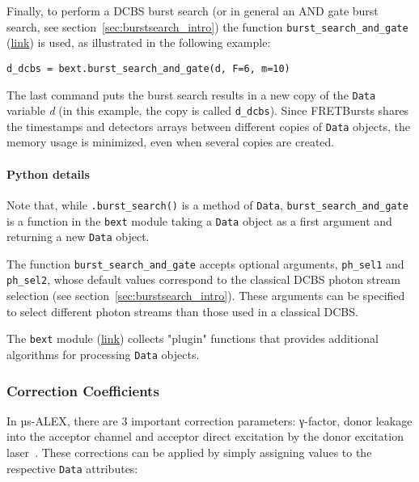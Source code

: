 Finally, to perform a DCBS burst search (or in general an AND gate burst search,
see section~\ref{sec:burstsearch_intro}) the function
\verb|burst_search_and_gate|
(\href{http://fretbursts.readthedocs.org/en/latest/plugins.html#fretbursts.burstlib_ext.burst_search_and_gate}{link})
is used, as illustrated in the following example:

\begin{lstlisting}
d_dcbs = bext.burst_search_and_gate(d, F=6, m=10)
\end{lstlisting}

The last command puts the burst search results in a new copy of the \verb|Data| variable \textit{d}
(in this example, the copy is called \verb|d_dcbs|).
Since FRETBursts shares the timestamps and detectors arrays between
different copies of \verb|Data| objects, the memory usage is minimized, even when 
several copies are created. 

\paragraph{Python details}
Note that, while \verb|.burst_search()| is a method of \verb|Data|,
\verb|burst_search_and_gate| is a function in the \verb|bext| module
taking a \verb|Data| object as a first argument and returning a new
\verb|Data| object.

The function \verb|burst_search_and_gate| accepts optional arguments,
\verb|ph_sel1| and \verb|ph_sel2|, whose default values correspond to the
classical DCBS photon stream selection (see section~\ref{sec:burstsearch_intro}).
These arguments can be specified to select different photon streams than those used in
a classical DCBS.

The \verb|bext| module (\href{http://fretbursts.readthedocs.org/en/latest/plugins.html}{link}) 
collects "plugin" functions that provides additional algorithms 
for processing \verb|Data| objects. 

\subsubsection{Correction Coefficients}
\label{sec:corrcoeff}

In µs-ALEX, there are 3 important correction parameters: γ-factor, donor leakage into the acceptor channel
and acceptor direct excitation by the donor excitation laser~\cite{Lee_2005}.
These corrections can be applied by simply assigning values to the respective \verb|Data| attributes:

